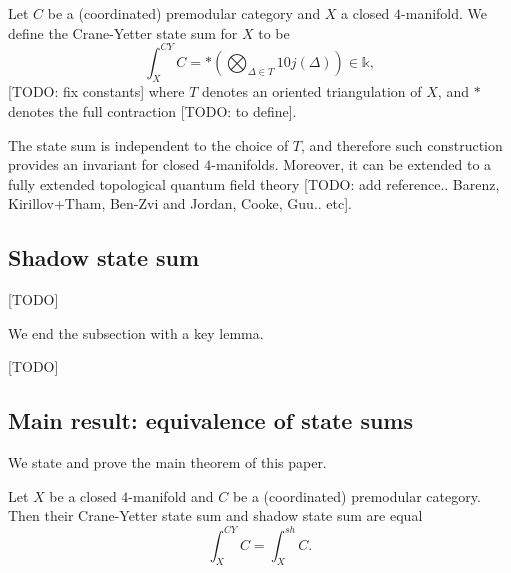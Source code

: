 \begin{definition}\label{def/crane-yetter-state-sum-for-a-closed-4-manifold}
  Let $C$ be a (coordinated) premodular category and $X$ a closed
  $4$-manifold. We define the Crane-Yetter state sum for $X$ to
  be
  $$
  \int_{X}^{CY} C = \ast \left( \bigotimes_{\Delta \in T} 10j(\Delta) \right) \in \mathbb{k},
  $$
  [TODO: fix constants] where $T$ denotes an oriented
  triangulation of $X$, and $\ast$ denotes the full contraction
  [TODO: to define].
\end{definition}

\noindent The state sum is independent to the choice of $T$, and
therefore such construction provides an invariant for closed
$4$-manifolds. Moreover, it can be extended to a fully extended
topological quantum field theory [TODO: add reference.. Barenz,
Kirillov+Tham, Ben-Zvi and Jordan, Cooke, Guu.. etc].

\subsection{Shadow state sum}

\begin{proposition}\label{prop/shadow-state-sum-is-local}
  [TODO]
\end{proposition}

\noindent We end the subsection with a key lemma.

\begin{lemma}\label{lemma/10j-symbol-as-shadow-state-sum}
  [TODO]
\end{lemma}

\subsection{Main result: equivalence of state sums}

\noindent We state and prove the main theorem of this paper.

\begin{theorem}
  Let $X$ be a closed $4$-manifold and $C$ be a (coordinated)
  premodular category. Then their Crane-Yetter state sum and
  shadow state sum are equal
  $$\int^{CY}_{X}C = \int^{sh}_{X} C.$$
\end{theorem}

